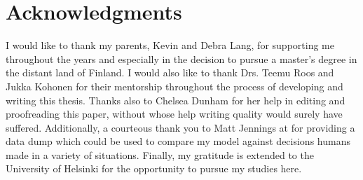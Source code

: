 
\section*{Acknowledgments}


I would like to thank my parents, Kevin and Debra Lang,
for supporting me
throughout the years and especially in the decision to pursue a master's degree
in the distant land of Finland.
%
I would also like to thank Drs. Teemu Roos
and Jukka Kohonen
for %
their mentorship throughout the
process of developing and writing this thesis.
%
Thanks also to Chelsea Dunham for her help in editing and proofreading
this paper,
without whose help writing quality would surely have suffered.
%
Additionally,
a courteous thank you to Matt Jennings at
 for providing a data dump
which could be used to compare my model against decisions humans made
in a variety of situations.
%
Finally, my gratitude is extended to the University of Helsinki for the
opportunity to pursue my studies here.


\newpage
